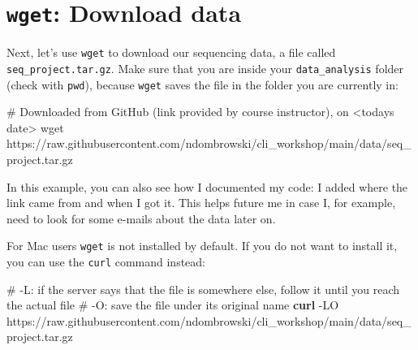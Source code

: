 \documentclass[
  letterpaper,
  DIV=11,
  numbers=noendperiod]{scrreprt}
\newenvironment{Shaded}{}{}
\newcommand{\AttributeTok}[1]{\textcolor[rgb]{0.84,0.23,0.29}{#1}}
\newcommand{\CommentTok}[1]{\textcolor[rgb]{0.42,0.45,0.49}{#1}}
\newcommand{\ExtensionTok}[1]{\textcolor[rgb]{0.84,0.23,0.29}{\textbf{#1}}}
\newcommand{\FunctionTok}[1]{\textcolor[rgb]{0.44,0.26,0.76}{#1}}
\newcommand{\NormalTok}[1]{\textcolor[rgb]{0.14,0.16,0.18}{#1}}
\begin{document}
\section{\texorpdfstring{\texttt{wget}: Download
data}{wget: Download data}}\label{wget-download-data}

Next, let's use \texttt{wget} to download our sequencing data, a file
called \texttt{seq\_project.tar.gz}. Make sure that you are inside your
\texttt{data\_analysis} folder (check with \texttt{pwd}), because
\texttt{wget} saves the file in the folder you are currently in:

\begin{Shaded}
\begin{Highlighting}[]
\CommentTok{\# Downloaded from GitHub (link provided by course instructor), on \textless{}today\textquotesingle{}s date\textgreater{}}
\FunctionTok{wget}\NormalTok{ https://raw.githubusercontent.com/ndombrowski/cli\_workshop/main/data/seq\_project.tar.gz}
\end{Highlighting}
\end{Shaded}

In this example, you can also see how I documented my code: I added
where the link came from and when I got it. This helps future me in case
I, for example, need to look for some e-mails about the data later on.

\begin{tcolorbox}[enhanced jigsaw, coltitle=black, breakable, titlerule=0mm, colback=white, rightrule=.15mm, bottomrule=.15mm, toprule=.15mm, colframe=quarto-callout-important-color-frame, colbacktitle=quarto-callout-important-color!10!white, bottomtitle=1mm, opacitybacktitle=0.6, toptitle=1mm, leftrule=.75mm, arc=.35mm, title=\textcolor{quarto-callout-important-color}{\faExclamation}\hspace{0.5em}{Wget for Mac users}, left=2mm, opacityback=0]

For Mac users \texttt{wget} is not installed by default. If you do not
want to install it, you can use the \texttt{curl} command instead:

\begin{Shaded}
\begin{Highlighting}[]
\CommentTok{\# {-}L: if the server says that the file is somewhere else, follow it until you reach the actual file}
\CommentTok{\# {-}O: save the file under its original name}
\ExtensionTok{curl} \AttributeTok{{-}LO}\NormalTok{ https://raw.githubusercontent.com/ndombrowski/cli\_workshop/main/data/seq\_project.tar.gz}
\end{Highlighting}
\end{Shaded}

\end{tcolorbox}
\end{document}
